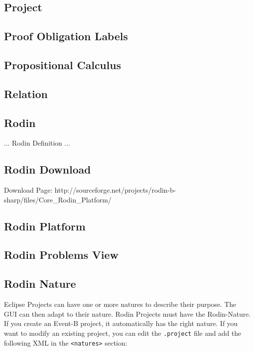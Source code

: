 \subsection{Project}
\label{project}

\subsection{Proof Obligation Labels}
\label{po_labels}

\subsection{Propositional Calculus}
\label{propositional_calculus}

\subsection{Relation}
\label{relation}

\subsection{Rodin}
\label{rodin}

... Rodin Definition ...

\subsection{Rodin Download}
\label{rodin_download}

Download Page: http://sourceforge.net/projects/rodin-b-sharp/files/Core\_Rodin\_Platform/


\subsection{Rodin Platform}
\label{rodin_platform}



\subsection{Rodin Problems View}
\label{rodin_problems_view}


\subsection{Rodin Nature}
\label{rodin_nature}

Eclipse Projects can have one or more natures to describe their purpose.  The GUI can then adapt to their nature.  Rodin Projects must have the Rodin-Nature.  If you create an Event-B project, it automatically has the right nature.  If you want to modify an existing project, you can edit the \texttt{.project} file and add the following XML in the \texttt{<natures>} section:

